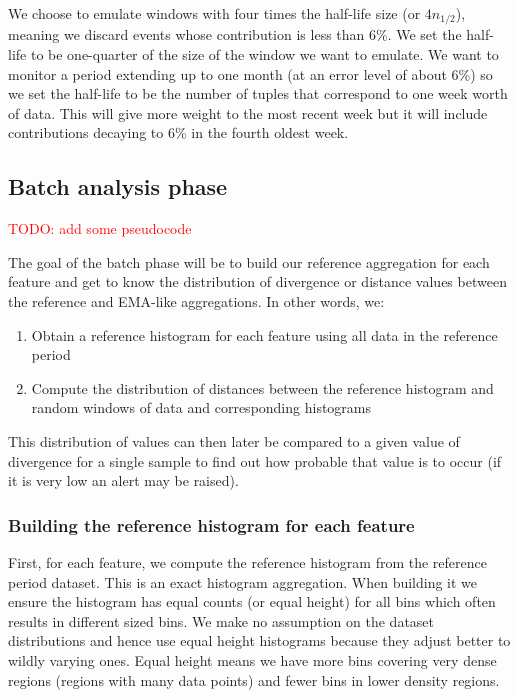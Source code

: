 We choose to emulate windows with four times the half-life size (or $4n_{1/2}$), meaning we discard events whose contribution is less than 6\%. We set the half-life to be one-quarter of the size of the window we want to emulate. We want to monitor a period extending up to one month (at an error level of about 6\%) so we set the half-life to be the number of tuples that correspond to one week worth of data. This will give more weight to the most recent week but it will include contributions decaying to 6\% in the fourth oldest week.

\subsection{Batch analysis phase} \label{sec:batch-phase}
\textcolor{red}{TODO: add some pseudocode}

The goal of the batch phase will be to build our reference aggregation for each feature and get to know the distribution of divergence or distance values between the reference and EMA-like aggregations. In other words, we:

\begin{enumerate}
    \item Obtain a reference histogram for each feature using all data in the reference period
    
    \item Compute the distribution of distances between the reference histogram and random windows of data and corresponding histograms
\end{enumerate}

This distribution of values can then later be compared to a given value of divergence for a single sample to find out how probable that value is to occur (if it is very low an alert may be raised).

\subsubsection*{Building the reference histogram for each feature}

First, for each feature, we compute the reference histogram from the reference period dataset. This is an exact histogram aggregation. When building it we ensure the histogram has equal counts (or equal height) for all bins which often results in different sized bins. We make no assumption on the dataset distributions and hence use equal height histograms because they adjust better to wildly varying ones. Equal height means we have more bins covering very dense regions (regions with many data points) and fewer bins in lower density regions. 

